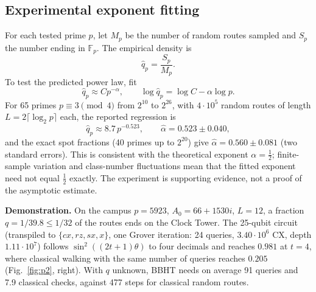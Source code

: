 \documentclass[10pt,a4paper]{article}
\begin{document}
\subsection*{Experimental exponent fitting}

For each tested prime \(p\), let \(M_p\) be the number of
random routes sampled and \(S_p\) the number ending in
\(\mathbb F_p\). The empirical density is
\[
\widehat q_p=\frac{S_p}{M_p}.
\]
To test the predicted power law, fit
\[
\widehat q_p\approx Cp^{-\alpha},
\qquad
\log\widehat q_p=\log C-\alpha\log p.
\]
For 65 primes $p\equiv3\pmod4$ from $2^{10}$ to $2^{26}$, with $4\cdot10^5$
random routes of length $L=2\lceil\log_2p\rceil$ each, the reported regression is
\[
\boxed{\widehat q_p\approx8.7\,p^{-0.523},}
\qquad
\boxed{\widehat\alpha=0.523\pm0.040,}
\]
and the exact spot fractions (40 primes up to $2^{20}$) give
$\widehat\alpha=0.560\pm0.081$ (two standard errors).
This is consistent with the theoretical exponent
\(\alpha=\tfrac12\); finite-sample variation and class-number
fluctuations mean that the fitted exponent need not equal
\(\tfrac12\) exactly. The experiment is supporting evidence,
not a proof of the asymptotic estimate.

\textbf{Demonstration.} On the campus $p=5923$, $A_0=66+1530i$, $L=12$, a
fraction $q=1/39.8\le1/32$ of the routes ends on the Clock Tower. The
25-qubit circuit (transpiled to $\{cx,rz,sx,x\}$, one Grover iteration:
24 queries, $3.40\cdot10^6$ CX, depth $1.11\cdot10^7$) follows
$\sin^2((2t+1)\theta)$ to four decimals and reaches $0.981$ at $t=4$, where
classical walking with the same number of queries reaches $0.205$
(Fig.~\ref{fig:p2}, right). With $q$ unknown, BBHT needs on average 91 queries
and 7.9 classical checks, against 477 steps for classical random routes.
\end{document}
